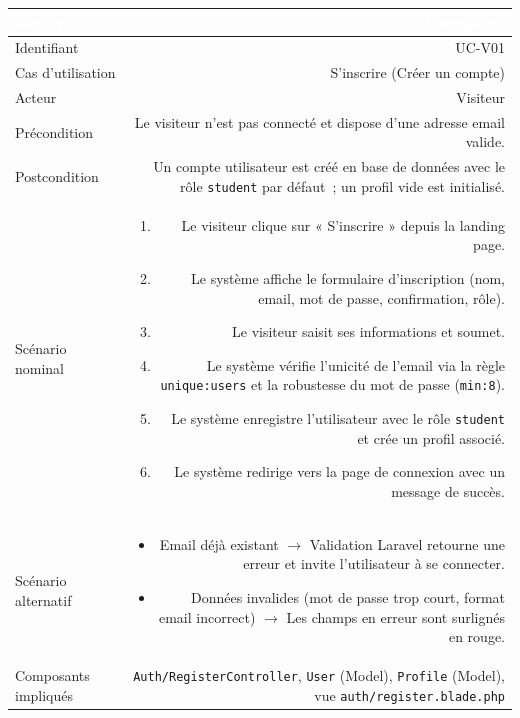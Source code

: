 \documentclass[a4paper,12pt]{article}
\begin{document}
\noindent
\begin{tabular}{|L|R|}
\hline
{}\textcolor{white}{\textbf{Champ}} & \textcolor{white}{\textbf{Description}} \\
\hline
{}Identifiant & UC-V01 \\
\hline
Cas d'utilisation & S'inscrire (Créer un compte) \\
\hline
{}Acteur & Visiteur \\
\hline
Précondition & Le visiteur n'est pas connecté et dispose d'une adresse email valide. \\
\hline
{}Postcondition & Un compte utilisateur est créé en base de données avec le rôle \texttt{student} par défaut~; un profil vide est initialisé. \\
\hline
Scénario nominal &
\begin{enumerate}
  \item Le visiteur clique sur « S'inscrire » depuis la landing page.
  \item Le système affiche le formulaire d'inscription (nom, email, mot de passe, confirmation, rôle).
  \item Le visiteur saisit ses informations et soumet.
  \item Le système vérifie l'unicité de l'email via la règle \texttt{unique:users} et la robustesse du mot de passe (\texttt{min:8}).
  \item Le système enregistre l'utilisateur avec le rôle \texttt{student} et crée un profil associé.
  \item Le système redirige vers la page de connexion avec un message de succès.
\end{enumerate} \\
\hline
{}Scénario alternatif &
\begin{itemize}
  \item Email déjà existant $\rightarrow$ Validation Laravel retourne une erreur et invite l'utilisateur à se connecter.
  \item Données invalides (mot de passe trop court, format email incorrect) $\rightarrow$ Les champs en erreur sont surlignés en rouge.
\end{itemize} \\
\hline
Composants impliqués & \texttt{Auth/RegisterController}, \texttt{User} (Model), \texttt{Profile} (Model), vue \texttt{auth/register.blade.php} \\
\hline
\end{tabular}
\end{document}
